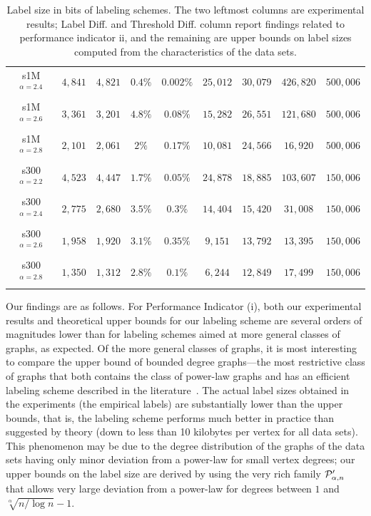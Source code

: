 \begin{table}
\begin{tabular}{ccccccccc}
s1M$^{\alpha=2.4}$  &$4,841$    &$4,821$  & $0.4\%$ & $0.002\%$  & $25,012 $ &$30,079$     &$426,820$ &$500,006$\\
s1M$^{\alpha=2.6}$  &$3,361$    &$3,201$   & $4.8\%$ & $0.08\%$  & $15,282 $ &$26,551$     &$121,680$ &$500,006$\\
s1M$^{\alpha=2.8}$  &$2,101$    &$2,061$    & $2\%$ & $0.17\%$  & $10,081 $ &$24,566$     &$16,920$  &$500,006$\\
s300$^{\alpha=2.2}$ &$4,523$    &$4,447$  & $1.7\%$ & $0.05\%$  & $24,878 $ &$18,885$     &$103,607$ &$150,006$\\
s300$^{\alpha=2.4}$ &$2,775$    &$2,680$   & $3.5\%$  & $0.3\%$ & $14,404 $ &$15,420$     &$31,008$  &$150,006$\\
s300$^{\alpha=2.6}$ &$1,958$    &$1,920$  & $3.1\%$ & $0.35\%$   & $9,151 $  &$13,792$     &$13,395$  &$150,006$\\
s300$^{\alpha=2.8}$ &$1,350$    &$1,312$  & $2.8\%$ & $0.1\%$   & $6,244 $  &$12,849$     &$17,499$  &$150,006$\\\hline
\end{tabular}
\caption{Label size in bits of labeling schemes. The two leftmost columns are experimental results; Label Diff. and  Threshold Diff. column  report findings related to  performance indicator ii, and the remaining are upper bounds on label sizes computed from the characteristics of the data sets.}
\label{t:labelsizes}
\end{table}

Our findings are as follows.
For Performance Indicator (i), both our experimental results and theoretical upper bounds for our labeling scheme are several orders of magnitudes lower than for labeling schemes aimed at more general classes of graphs, as expected. Of the more general classes of graphs, it is most interesting to compare the upper bound of bounded degree graphs---the most restrictive class of graphs that both contains the class of power-law graphs and has an efficient labeling scheme described in the literature~\cite{adjiashvili2014labeling}.
The actual label sizes obtained in the experiments (the empirical labels) are substantially lower than the upper bounds, that is, the labeling scheme performs much better in practice than suggested by theory (down to less than 10 kilobytes per vertex for all data sets). 
This phenomenon may be due to the degree distribution of the graphs of the data sets having only minor deviation from a power-law for small vertex degrees; our upper bounds on the label size are derived by using the very rich family $ \mathcal{P}'_{\alpha,n}$ that allows very large deviation from a power-law for degrees between $1$ and $\sqrt[\alpha]{n/\log n} - 1$.

